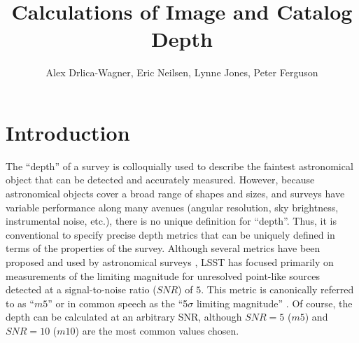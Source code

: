 \documentclass[DM,authoryear,toc]{lsstdoc}
\title{Calculations of Image and Catalog Depth}
\author{%
Alex Drlica-Wagner,
Eric Neilsen,
Lynne Jones,
Peter Ferguson
}
\date{\vcsDate}
\begin{document}
\maketitle


\section{Introduction}

The ``depth'' of a survey is colloquially used to describe the faintest astronomical object that can be detected and accurately measured. However, because astronomical objects cover a broad range of shapes and sizes, and surveys have variable performance along many avenues (angular resolution, sky brightness, instrumental noise, etc.), there is no unique definition for ``depth''. Thus, it is conventional to specify precise depth metrics that can be uniquely defined in terms of the properties of the survey. Although several metrics have been proposed and used by astronomical surveys \citep[e.g.,][]{Rykoff:2015, DES-DR2}, LSST has focused primarily on measurements of the limiting magnitude for unresolved point-like sources detected at a signal-to-noise ratio ($SNR$) of $5$. This metric is canonically referred to as  ``$m5$'' or in common speech as the ``5$\sigma$ limiting magnitude'' \citep[e.g.,][]{SMTN-002}. Of course, the depth can be calculated at an arbitrary SNR, although ${SNR} = 5$ ($m5$) and ${SNR} = 10$ ($m10$) are the most common values chosen.
\end{document}
